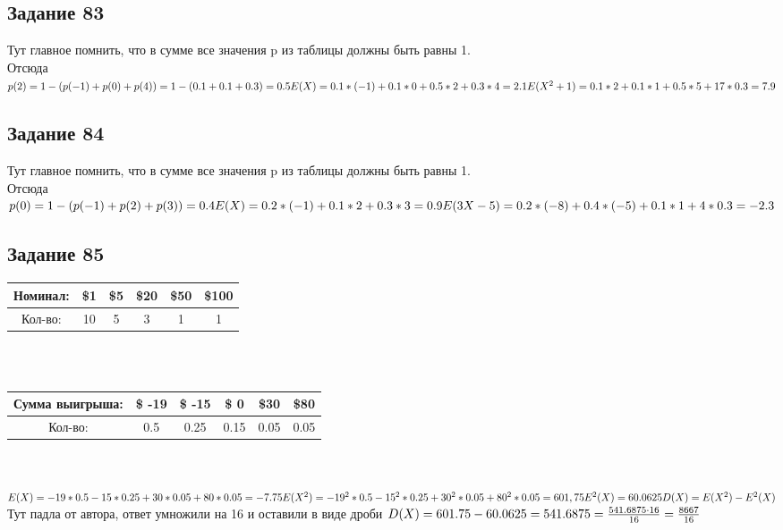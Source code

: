 \documentclass[12pt]{article}
\begin{document}
\subsection{Задание 83}
Тут главное помнить, что в сумме все значения p из таблицы должны быть равны 1.\\
Отсюда \\
$
p(2)=1 - (p(-1) + p(0)+ p(4)) =
  1-(0.1+0.1+0.3)=0.5\\
E(X) = 0.1 * (-1) + 0.1 * 0 + 0.5*2  +  0.3*4 = 2.1\\
E(X^{2}+1) = 0.1 * 2 + 0.1 * 1 + 0.5*5  + 17*0.3 = 7.9\\
$
\newpage
\subsection{Задание 84}
Тут главное помнить, что в сумме все значения p из таблицы должны быть равны 1.\\
Отсюда 
$
p(0)=1 - (p(-1) + p(2)+ p(3)) =  0.4\\
E(X) = 0.2 * (-1) + 0.1 * 2 + 0.3 * 3 = 0.9\\
E(3X-5) = 0.2 * (-8) + 0.4 * (-5)+ 0.1*1  + 4*0.3 = -2.3\\
$
\newpage
\subsection{Задание 85}
\begin{tabular}{|c|c|c|c|c|c|}
\hline
Номинал: & \$1 & \$5 & \$20 & \$50 & \$100 \\
\hline
Кол-во: & 10 & 5 & 3 & 1 & 1 \\
\hline
\end{tabular}
\\
\\
\begin{tabular}{|c|c|c|c|c|c|}
\hline
Сумма выигрыша: & \$ -19 & \$ -15 & \$ 0 & \$30 & \$80 \\
\hline
Кол-во: & 0.5 & 0.25 & 0.15 & 0.05 & 0.05 \\
\hline
\end{tabular}
\\
\\
$
E(X)=-19*0.5-15*0.25+30*0.05+80*0.05=-7.75\\
E(X^2)=-19^2*0.5-15^2*0.25+30^2*0.05+80^2*0.05=601,75\\
E^2(X)=60.0625\\
D(X)=E(X^2)-E^2(X)\\
$
Тут падла от автора, ответ умножили на 16 и оставили в виде дроби
$
D(X)=601.75-60.0625=541.6875=\frac{541.6875\cdot 16}{16}=\frac{8667}{16}\\
$
\newpage
\end{document}
